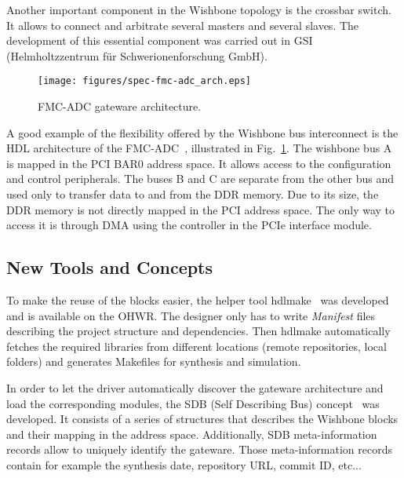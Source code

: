 \documentclass{JAC2003}
\begin{document}
Another important component in the Wishbone topology is the crossbar switch.
It allows to connect and arbitrate several masters and several slaves.
The development of this essential component was carried out in GSI (Helmholtzzentrum f\"ur Schwerionenforschung GmbH).

\begin{figure}[htb]
   \centering
   \texttt{[image: figures/spec-fmc-adc\_arch.eps]}
   \caption{FMC-ADC gateware architecture.}
   \label{spec-fmc-adc_arch}
\end{figure}

A good example of the flexibility offered by the Wishbone bus interconnect is the HDL architecture of the FMC-ADC~\cite{fmc-adc}, illustrated in Fig.~\ref{spec-fmc-adc_arch}.
The wishbone bus A is mapped in the PCI BAR0 address space.
It allows access to the configuration and control peripherals.
The buses B and C are separate from the other bus and used only to transfer data to and from the DDR memory.
Due to its size, the DDR memory is not directly mapped in the PCI address space.
The only way to access it is through DMA using the controller in the PCIe interface module.

\subsection{New Tools and Concepts}

To make the reuse of the blocks easier, the helper tool hdlmake~\cite{hdlmake} was developed and is available on the OHWR.
The designer only has to write \textit{Manifest} files describing the project structure and dependencies.
Then hdlmake automatically fetches the required libraries from different locations (remote repositories, local folders) and generates Makefiles for synthesis and simulation.

In order to let the driver automatically discover the gateware architecture and load the corresponding modules, the SDB (Self Describing Bus) concept~\cite{sdb} was developed.
It consists of a series of structures that describes the Wishbone blocks and their mapping in the address space.
Additionally, SDB meta-information records allow to uniquely identify the gateware.
Those meta-information records contain for example the synthesis date, repository URL, commit ID, etc...
\end{document}
